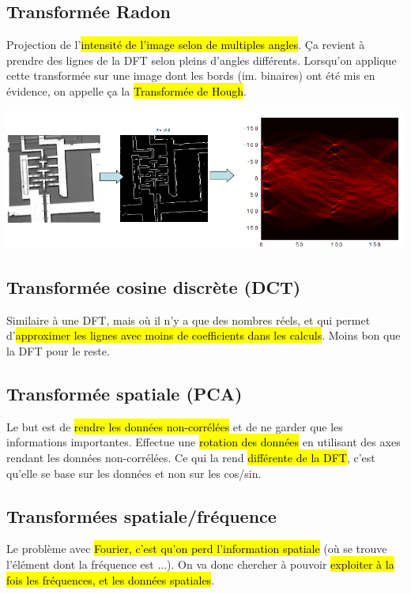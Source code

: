 \documentclass[letterpaper, 12pt]{article}
\newcommand{\alinea}{
\hspace*{0.5cm}}
\newcommand{\red}[1]{
	\textcolor{red}{#1}}
\begin{document}
	\subsection{Transformée Radon}
		\alinea Projection de l'\hl{intensité de l'image selon de multiples angles}. Ça revient à prendre des lignes de la DFT selon pleins
			d'angles différents. Lorsqu'on applique cette transformée sur une image dont les bords (im. binaires) ont été mis en évidence, 
			on appelle ça la \red{\hl{Transformée de Hough}}. 
		\begin{center}
			\includegraphics[width=5.5in]{Images/hough}
		\end{center}
	\subsection{Transformée cosine discrète (DCT)}
		\alinea Similaire à une DFT, mais où il n'y a que des nombres réels, et qui permet d'\hl{approximer les lignes avec moins de 
			coefficients dans les calculs}. Moins bon que la DFT pour le reste.
	\subsection{Transformée spatiale (PCA)}
		\alinea Le but est de \hl{rendre les données non-corrélées} et de ne garder que les informations importantes.
			Effectue une \hl{rotation des données }en utilisant des axes rendant les données non-corrélées.
			Ce qui la rend \hl{différente de la DFT}, c'est qu'elle se base sur les données et non sur les cos/sin.
	\subsection{Transformées spatiale/fréquence}
		\alinea Le problème avec \hl{Fourier, c'est qu'on perd l'information spatiale} (où se trouve l'élément dont la fréquence est ...).
			On va donc chercher à pouvoir \hl{exploiter à la fois les fréquences, et les données spatiales}.
\end{document}
